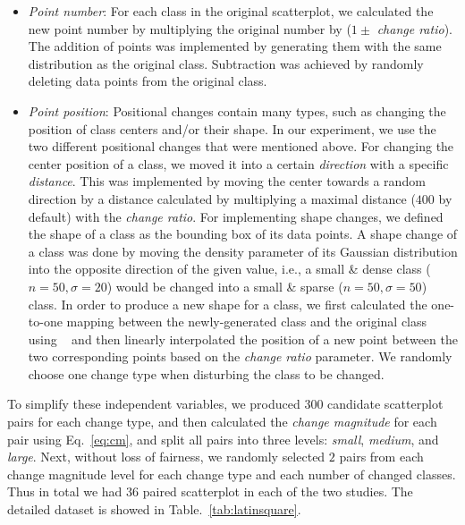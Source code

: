 \begin{itemize}

     \item \emph{Point number}: For each class in the original scatterplot,  we calculated the new point number by multiplying the original number by ($1 \pm$ \emph{change ratio}). The addition of points was implemented by generating them with the same distribution as the original class. Subtraction was achieved by randomly deleting data points from the original class.

     \item \emph{Point position}: Positional changes contain many types, such as changing the position of class centers and/or their shape. In our experiment, we use the two different positional changes that were mentioned above. For changing the center position of a class, we  moved it into a certain \emph{direction} with a specific \emph{distance}.  This was implemented by moving the center towards a random direction by a distance calculated by multiplying a maximal distance ($400$ by default) with the \emph{change ratio}. For implementing shape changes, we defined the shape of a class as the bounding box of its data points. A shape change of a class was done by moving the density parameter of its Gaussian distribution into the opposite direction of the given value, i.e., a small \& dense class ($n=50, \sigma=20$) would be changed into a small \& sparse ($n=50, \sigma=50$) class. In order to produce a new shape for a class, we first calculated the one-to-one mapping between the newly-generated class and the original class using ~\cite{kuhn1955hungarian} and then linearly interpolated the position of a new point between the two corresponding points based on the \emph{change ratio} parameter. We randomly choose one change type when disturbing the class to be changed.
\end{itemize}
To simplify these independent variables, we produced 300 candidate scatterplot pairs for each change type, and then calculated the \emph{change magnitude} for each pair using Eq.~\ref{eq:cm}, and split all  pairs into three levels: \emph{small}, \emph{medium}, and \emph{large}.
Next, without loss of fairness, we randomly selected $2$ pairs from each change magnitude level for each change type and each number of changed classes. Thus in total we had $36$ paired scatterplot in each of the two studies. The detailed dataset is showed in Table.~\ref{tab:latinsquare}.

